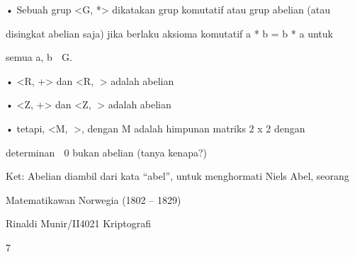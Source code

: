 \documentclass{article}
\begin{document}

• Sebuah grup <G, *> dikatakan grup komutatif atau grup abelian (atau 

disingkat abelian saja) jika berlaku aksioma komutatif a * b = b * a untuk 

semua a, b  G.

• <R, +> dan <R, > adalah abelian

• <Z, +> dan <Z, > adalah abelian

• tetapi, <M, >, dengan M adalah himpunan matriks 2 x 2 dengan 

determinan  0 bukan abelian (tanya kenapa?)

Ket: Abelian diambil dari kata “abel”, untuk menghormati Niels Abel, seorang 

Matematikawan Norwegia (1802 – 1829)

Rinaldi Munir/II4021 Kriptografi

7
\end{document}
